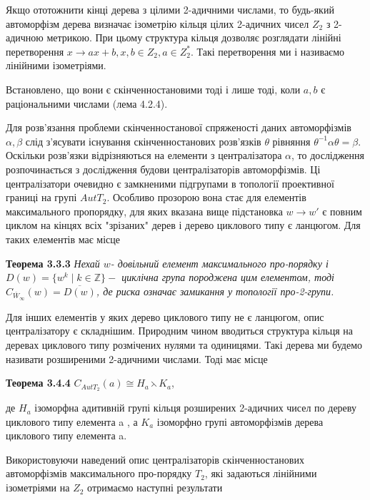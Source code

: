 \documentclass[a4paper,12pt]{article} \usepackage{a4wide}
\numberwithin{equation}{subsection}
\begin{document}

 Якщо ототожнити кінці дерева з цілими 2-адичними числами, то будь-який автоморфізм дерева
визначає ізометрію кільця  цілих 2-адичних чисел $Z_2$ з 2-адичною метрикою. При цьому структура кільця
дозволяє розглядати лінійні перетворення $ x \to a x +b, x,b \in Z_2, a \in Z_2^*. $ Такі перетворення ми і
називаємо лінійними ізометріями.

Встановлено, що вони є скінченностановими тоді і лише тоді, коли $a,b$ є раціональними числами (лема 4.2.4).

Для розв'язання проблеми скінченностанової спряженості даних автоморфізмів $\alpha,\beta$ слід з'ясувати
існування скінченностанових розв'язків  $\theta$ рівняння $\theta^{-1} \alpha \theta = \beta.$ Оскільки
розв'язки відрізняються на елементи з централізатора $\alpha$, то дослідження розпочинається з дослідження
будови централізаторів автоморфізмів.  Ці централізатори очевидно є замкненими підгрупами в топології
проективної границі на групі $Aut T_2$. Особливо прозорою вона стає для елементів максимального пропорядку, для
яких вказана вище підстановка $w \to w'$ є повним циклом на кінцях всіх "зрізаних" дерев і дерево циклового
типу є ланцюгом. Для таких елементів має місце

 \textbf{Теорема 3.3.3}
\emph{Нехай $ w$- довільний елемент максимального
  про-порядку і $D(w)= \{ w^k\mid k\in \mathbb{Z} \} -$ циклічна група породжена цим елементом,
   тоді $ C_{\overline{W}_\infty}(w)=\overline{D(w)}$,
   де риска означає замикання у топології про-2-групи.}


Для інших елементів у яких дерево циклового типу не є ланцюгом, опис централізатору є складнішим. Природним
чином вводиться структура кільця   на деревах циклового типу розмічених нулями та одиницями. Такі дерева ми
будемо називати розширеними 2-адичними числами. Тоді має місце

\textbf{Теорема 3.4.4}
\emph{$C_{AutT_2}(a)\cong H_a\leftthreetimes K_a$},

  де $H_a$ ізоморфна адитивній групі кільця розширених 2-адичних чисел по дереву циклового типу елемента a ,
  а $K_a$ ізоморфно групі автоморфізмів дерева циклового типу елемента a.





Використовуючи наведений опис централізаторів скінченностанових автоморфізмів максимального про-порядку
  $T_2$, які задаються лінійними ізометріями на
$Z_2$ отримаємо наступні результати
\end{document}
